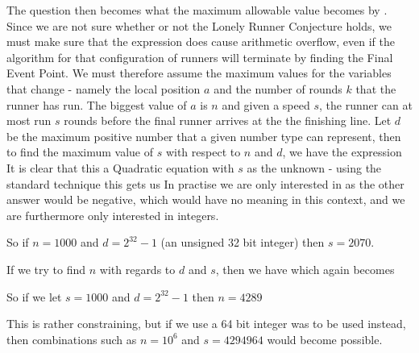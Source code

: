 
The question then becomes what the maximum allowable value becomes by . Since we are not sure whether or not the Lonely Runner Conjecture holds, we must make sure that the expression does cause arithmetic overflow, even if the algorithm for that configuration of runners will terminate by finding the Final Event Point. We must therefore assume the maximum values for the variables that change - namely the local position $a$ and the number of rounds $k$ that the runner has run. The biggest value of $a$ is $n$ and given a speed $s$, the runner can at most run $s$ rounds before the final runner arrives at the the finishing line. Let $d$ be the maximum positive number that a given number type can represent, then to find the maximum value of $s$ with respect to $n$ and $d$, we have the expression 
It is clear that this a Quadratic equation with $s$ as the unknown - using the standard technique this gets us
In practise we are only interested in
as the other answer would be negative, which would have no meaning in this context, and we are furthermore only interested in integers.

So if $n = 1000$ and $d = 2^{32}-1$ (an unsigned 32 bit integer) then $s = 2070$.

If we try to find $n$ with regards to $d$ and $s$, then we have
which again becomes

So if we let $s = 1000$ and $d = 2^{32}-1$ then $n = 4289$

This is rather constraining, but if we use a 64 bit integer was to be used instead, then combinations such as $n = 10^6$ and $s = 4294964$ would become possible.

